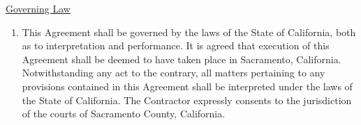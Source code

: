 \underline{Governing Law}
\begin{enumerate}[
    ref = \SecondLevelEnumerator
]
    \item This Agreement shall be governed by the laws of the State of
    California, both as to interpretation and performance. It is agreed
    that execution of this Agreement shall be deemed to have taken place in
    Sacramento, California. Notwithstanding any act to the contrary, all
    matters pertaining to any provisions contained in this Agreement shall
    be interpreted under the laws of the State of California. The
    Contractor expressly consents to the jurisdiction of the courts of
    Sacramento County, California.
\end{enumerate}